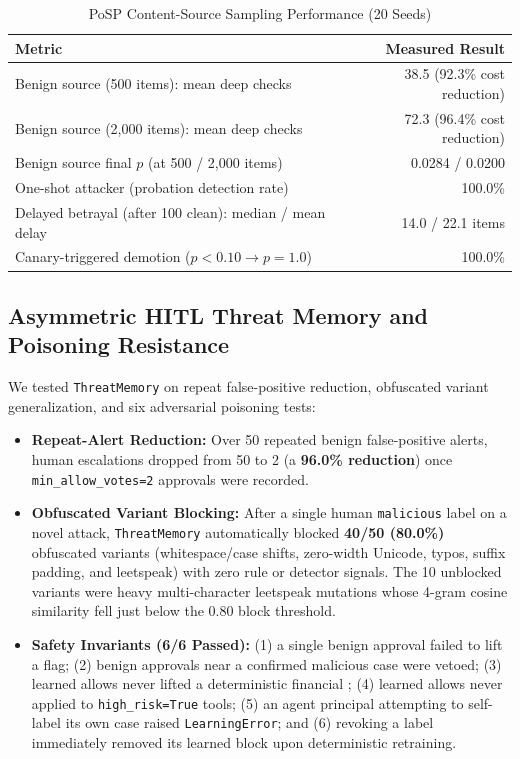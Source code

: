 \documentclass[conference]{IEEEtran}
\begin{document}
\begin{table}[t]
\centering
\caption{PoSP Content-Source Sampling Performance (20 Seeds)}
\label{tab:posp}
\begin{tabular}{lr}
\toprule
\textbf{Metric} & \textbf{Measured Result} \\
\midrule
Benign source (500 items): mean deep checks & 38.5 (92.3\% cost reduction) \\
Benign source (2,000 items): mean deep checks & 72.3 (96.4\% cost reduction) \\
Benign source final $p$ (at 500 / 2,000 items) & 0.0284 / 0.0200 \\
One-shot attacker (probation detection rate) & 100.0\% \\
Delayed betrayal (after 100 clean): median / mean delay & 14.0 / 22.1 items \\
Canary-triggered demotion ($p < 0.10 \to p = 1.0$) & 100.0\% \\
\bottomrule
\end{tabular}
\end{table}

\subsection{Asymmetric HITL Threat Memory and Poisoning Resistance}
We tested \texttt{ThreatMemory} on repeat false-positive reduction, obfuscated variant generalization, and six adversarial poisoning tests:
\begin{itemize}
    \item \textbf{Repeat-Alert Reduction:} Over 50 repeated benign false-positive alerts, human escalations dropped from 50 to 2 (a \textbf{96.0\% reduction}) once \texttt{min\_allow\_votes=2} approvals were recorded.
    \item \textbf{Obfuscated Variant Blocking:} After a single human \texttt{malicious} label on a novel attack, \texttt{ThreatMemory} automatically blocked \textbf{40/50 (80.0\%)} obfuscated variants (whitespace/case shifts, zero-width Unicode, typos, suffix padding, and leetspeak) with zero rule or detector signals. The 10 unblocked variants were heavy multi-character leetspeak mutations whose 4-gram cosine similarity fell just below the 0.80 block threshold.
    \item \textbf{Safety Invariants (6/6 Passed):} (1) a single benign approval failed to lift a flag; (2) benign approvals near a confirmed malicious case were vetoed; (3) learned allows never lifted a deterministic financial ; (4) learned allows never applied to \texttt{high\_risk=True} tools; (5) an agent principal attempting to self-label its own case raised \texttt{LearningError}; and (6) revoking a label immediately removed its learned block upon deterministic retraining.
\end{itemize}
\end{document}
